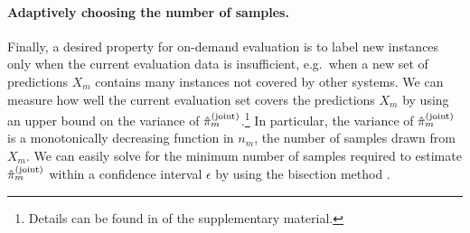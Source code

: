 \paragraph{Adaptively choosing the number of samples.}
Finally, a desired property for on-demand evaluation is to label new instances only when the current evaluation data is insufficient,
e.g.\ when a new set of predictions $X_m$ contains many instances not covered by other systems.
We can measure how well the current evaluation set covers the predictions $X_m$ by using an upper bound on the variance of ${\hat{\pi}}_m^{\text{(joint)}}$.\footnote{Details can be found in  of the supplementary material.}
In particular, the variance of ${\hat{\pi}}_m^{\text{(joint)}}$ is a monotonically decreasing function in $n_m$, the number of samples drawn from $X_m$.
We can easily solve for the minimum number of samples required to estimate ${\hat{\pi}}_m^{\text{(joint)}}$ within a confidence interval $\epsilon$ by using the bisection method \citep{burden1985bisection}.
